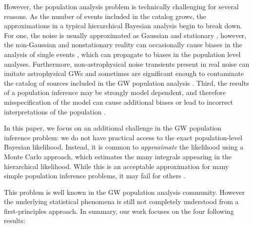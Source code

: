 However, the population analysis problem is technically challenging for several reasons. As the number of events included in the catalog grows, the approximations in a typical hierarchical Bayesian analysis begin to break down. For one, the noise is usually approximated as Gaussian and stationary \citep{Moore:2014lga,LIGOScientific:2019hgc}, however, the non-Gaussian and nonstationary reality can occasionally cause biases in the analysis of single events \citep{Pankow:2018qpo,Chatziioannou:2021ezd,Hourihane:2022doe,Davis:2022ird,Payne:2022spz,Ghonge:2023ksb,Macas:2023wiw,Udall:2024ovp}, which can propagate to biases in the population level analyses. Furthermore, non-astrophysical noise transients present in real noise can imitate astrophysical \acp{GW} and sometimes are significant enough to contaminate the catalog of sources included in the \ac{GW} population analysis \citep{Cabero:2019orq, Zevin:2016qwy,LIGO:2021ppb,Soni:2021cjy,Virgo:2022ysc, KAGRA:2020agh,Ashton:2021tvz,Magee:2024xiw}. Third, the results of a population inference may be strongly model dependent, and therefore misspecification of the model can cause additional biases or lead to incorrect interpretations of the population \citep[e.g.][]{Cheng:2023ddt, Alvarez-Lopez:2025ltt}.

In this paper, we focus on an additional challenge in the \ac{GW} population inference problem: we do not have practical access to the exact population-level Bayesian likelihood. 
Instead, it is common to \textit{approximate} the likelihood using a Monte Carlo approach, which estimates the many integrals appearing in the hierarchical likelihood. While this is an acceptable approximation for many simple population inference problems, it may fail for others \citep[e.g.][]{Golomb:2022bon}. 

This problem is well known in the \ac{GW} population analysis community. However the underlying statistical phenomena is still not completely understood from a first-principles approach. In summary, our work focuses on the four following results:

